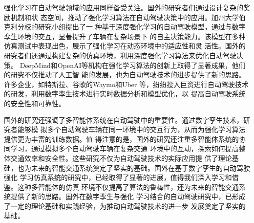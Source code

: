 强化学习在自动驾驶领域的应用同样备受关注。国外的研究者们通过设计复杂的奖励机制和状
态空间，推动了强化学习算法在自动驾驶决策中的应用。加州大学伯克利分校的研究小组提出了一
种基于深度强化学习的自动驾驶模型，通过与数字孪生环境的交互，显著提升了车辆在复杂场景下
的自主决策能力。该模型在多种仿真测试中表现出色，展示了强化学习在动态环境中的适应性和灵
活性。国外的研究者们还通过构建复杂的仿真环境，利用深度强化学习算法来优化自动驾驶决策。
DeepMind和OpenAI等机构在强化学习算法的创新上取得了显著成果，他们的研究不仅推动了人工智
能的发展，也为自动驾驶技术的进步提供了新的思路。许多企业，如特斯拉、谷歌的Waymo和Uber
等，纷纷投入巨资进行自动驾驶技术的研发，利用数字孪生技术进行实时数据分析和模型优化，以
提高自动驾驶系统的安全性和可靠性。

国外的研究还强调了多智能体系统在自动驾驶中的重要性。通过数字孪生技术，研究者能够模
拟多个自动驾驶车辆在同一环境中的交互行为，从而为强化学习算法提供更为丰富的训练数据。值
得注意的是，国外的研究还注重多智能体系统的协同学习，通过模拟多个自动驾驶车辆在复杂交通
环境中的互动，探索如何提高整体交通效率和安全性。这些研究不仅为自动驾驶技术的实际应用提
供了理论基础，也为未来的智能交通系统奠定了坚实的基础。国外在基于数字孪生的自动驾驶强化
学习仿真系统的研究中，已经取得了显著的进展，值得我们深入学习和借鉴。这种多智能体的仿真
环境不仅提高了算法的鲁棒性，还为未来的智能交通系统提供了新的思路。国外在数字孪生与强化
学习结合的自动驾驶研究中，已形成了一定的理论基础和实践经验，为推动自动驾驶技术的进一步
发展奠定了坚实的基础。





\begin{tabular}{l l}
\end{tabular}